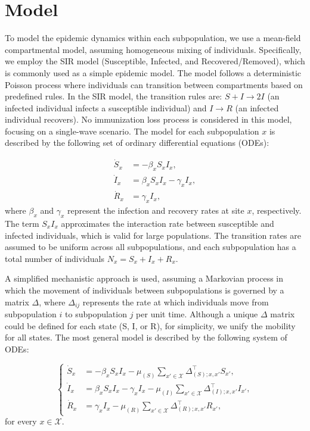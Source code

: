 \section{Model}

To model the epidemic dynamics within each subpopulation, we use a mean-field compartmental model, assuming homogeneous mixing of individuals. Specifically, we employ the SIR model (Susceptible, Infected, and Recovered/Removed), which is commonly used as a simple epidemic model. The model follows a deterministic Poisson process where individuals can transition between compartments based on predefined rules. In the SIR model, the transition rules are: \( S + I \rightarrow 2I \) (an infected individual infects a susceptible individual) and \( I \rightarrow R \) (an infected individual recovers). No immunization loss process is considered in this model, focusing on a single-wave scenario. The model for each subpopulation \( x \) is described by the following set of ordinary differential equations (ODEs):

\[
\begin{aligned}
    \dot{S}_{x} &= -\beta_{x} S_{x} I_{x}, \\
    \dot{I}_{x} &= \beta_{x} S_{x} I_{x} - \gamma_{x} I_{x}, \\
    \dot{R}_{x} &= \gamma_{x} I_{x},
\end{aligned}
\]
where \( \beta_x \) and \( \gamma_x \) represent the infection and recovery rates at site \( x \), respectively. The term \( S_x I_x \) approximates the interaction rate between susceptible and infected individuals, which is valid for large populations. The transition rates are assumed to be uniform across all subpopulations, and each subpopulation has a total number of individuals \( N_x = S_x + I_x + R_x \).

A simplified mechanistic approach is used, assuming a Markovian process in which the movement of individuals between subpopulations is governed by a matrix \( \Delta \), where \( \Delta_{ij} \) represents the rate at which individuals move from subpopulation \( i \) to subpopulation \( j \) per unit time. Although a unique \( \Delta \) matrix could be defined for each state (S, I, or R), for simplicity, we unify the mobility for all states. The most general model is described by the following system of ODEs:

\[
\left\{
\begin{aligned}
    \dot{S}_{x} &= -\beta_{x} S_{x} I_{x} - \mu_{(S)} \sum_{x' \in \mathcal{X}} \Delta_{(S);x,x'}^{\top} S_{x'}, \\
    \dot{I}_{x} &= \beta_{x} S_{x} I_{x} - \gamma_{x} I_{x} - \mu_{(I)} \sum_{x' \in \mathcal{X}} \Delta_{(I);x,x'}^{\top} I_{x'}, \\
    \dot{R}_{x} &= \gamma_{x} I_{x} - \mu_{(R)} \sum_{x' \in \mathcal{X}} \Delta_{(R);x,x'}^{\top} R_{x'},
\end{aligned}
\right.
\]
for every \( x \in \mathcal{X} \).

